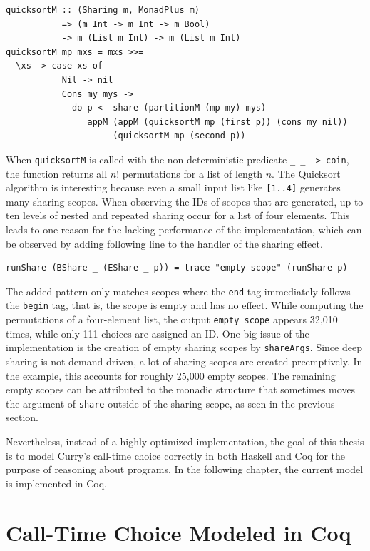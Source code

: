 \documentclass[a4paper, 11pt, fleqn, twoside, abstract=on]{scrreprt}
\newcommand{\hinl}[1]{\texttt{#1}}
\begin{document}
\begin{verbatim}
quicksortM :: (Sharing m, MonadPlus m) 
           => (m Int -> m Int -> m Bool) 
           -> m (List m Int) -> m (List m Int)
quicksortM mp mxs = mxs >>=
  \xs -> case xs of
           Nil -> nil
           Cons my mys ->
             do p <- share (partitionM (mp my) mys)
                appM (appM (quicksortM mp (first p)) (cons my nil)) 
                     (quicksortM mp (second p))
\end{verbatim}

When \hinl{quicksortM} is called with the non-deterministic predicate \hinl{\_ _ -> coin}, the function returns all $n!$ permutations for a list of length $n$.
The Quicksort algorithm is interesting because even a small input list like \hinl{[1..4]} generates many sharing scopes.
When observing the IDs of scopes that are generated, up to ten levels of nested and repeated sharing occur for a list of four elements.
This leads to one reason for the lacking performance of the implementation, which can be observed by adding following line to the handler of the sharing effect.

\begin{verbatim}
runShare (BShare _ (EShare _ p)) = trace "empty scope" (runShare p)
\end{verbatim}

The added pattern only matches scopes where the \hinl{end} tag immediately follows the \hinl{begin} tag, that is, the scope is empty and has no effect.
While computing the permutations of a four-element list, the output \hinl{empty scope} appears 32,010 times, while only 111 choices are assigned an ID.
One big issue of the implementation is the creation of empty sharing scopes by \hinl{shareArgs}.
Since deep sharing is not demand-driven, a lot of sharing scopes are created preemptively.
In the example, this accounts for roughly 25,000 empty scopes.
The remaining empty scopes can be attributed to the monadic structure that sometimes moves the argument of \hinl{share} outside of the sharing scope, as seen in the previous section.

Nevertheless, instead of a highly optimized implementation, the goal of this thesis is to model Curry's call-time choice correctly in both Haskell and Coq for the purpose of reasoning about programs.
In the following chapter, the current model is implemented in Coq.

\chapter{Call-Time Choice Modeled in Coq}
\label{ch:callTimeChoiceCoq}
\end{document}
